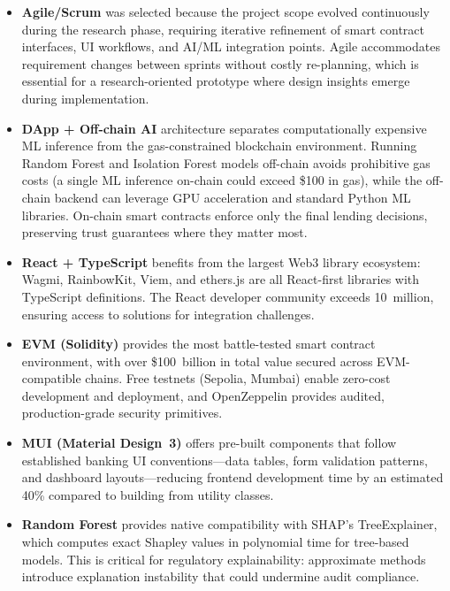 \documentclass[12pt,a4paper]{report}
\begin{document}
\begin{itemize}[noitemsep]
\item \textbf{Agile/Scrum} was selected because the project scope evolved continuously during the research phase, requiring iterative refinement of smart contract interfaces, UI workflows, and AI/ML integration points. Agile accommodates requirement changes between sprints without costly re-planning, which is essential for a research-oriented prototype where design insights emerge during implementation.

\item \textbf{DApp + Off-chain AI} architecture separates computationally expensive ML inference from the gas-constrained blockchain environment. Running Random Forest and Isolation Forest models off-chain avoids prohibitive gas costs (a single ML inference on-chain could exceed \$100 in gas), while the off-chain backend can leverage GPU acceleration and standard Python ML libraries. On-chain smart contracts enforce only the final lending decisions, preserving trust guarantees where they matter most.

\item \textbf{React + TypeScript} benefits from the largest Web3 library ecosystem: Wagmi, RainbowKit, Viem, and ethers.js are all React-first libraries with TypeScript definitions. The React developer community exceeds 10~million, ensuring access to solutions for integration challenges.

\item \textbf{EVM (Solidity)} provides the most battle-tested smart contract environment, with over \$100~billion in total value secured across EVM-compatible chains. Free testnets (Sepolia, Mumbai) enable zero-cost development and deployment, and OpenZeppelin provides audited, production-grade security primitives.

\item \textbf{MUI (Material Design~3)} offers pre-built components that follow established banking UI conventions---data tables, form validation patterns, and dashboard layouts---reducing frontend development time by an estimated 40\% compared to building from utility classes.

\item \textbf{Random Forest} provides native compatibility with SHAP's TreeExplainer, which computes exact Shapley values in polynomial time for tree-based models. This is critical for regulatory explainability: approximate methods introduce explanation instability that could undermine audit compliance.


\end{itemize}
\end{document}
